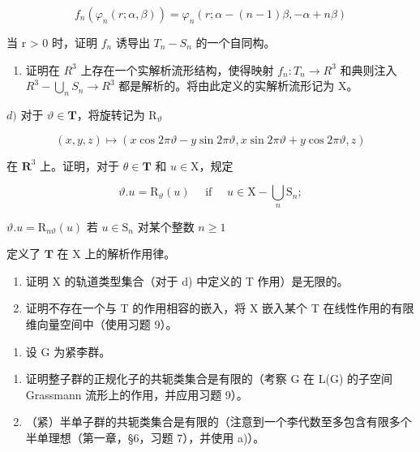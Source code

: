 \[
f _ {n} (\varphi_ {n} (r; \alpha , \beta)) = \varphi_ {n} (r; \alpha - (n - 1) \beta , - \alpha + n \beta)
\]

当 r \textgreater{} 0 时，证明 \(f_{n}\) 诱导出 \(T_{n} - S_{n}\) 的一个自同构。

\begin{enumerate}
\def\labelenumi{\alph{enumi})}
\setcounter{enumi}{2}
\tightlist
\item
  证明在 \(R^{3}\) 上存在一个实解析流形结构，使得映射 \(f_{n}: T_{n} \to R^{3}\) 和典则注入 \(R^{3}-\bigcup_{n} S_{n} \to R^{3}\) 都是解析的。将由此定义的实解析流形记为 X。
\end{enumerate}

\(d)\) 对于 \(\vartheta \in \mathbf{T}\)，将旋转记为 \(\mathrm{R}_{\vartheta}\)

\[
(x, y, z) \mapsto (x \cos 2 \pi \vartheta - y \sin 2 \pi \vartheta , x \sin 2 \pi \vartheta + y \cos 2 \pi \vartheta , z)
\]

在 \(\mathbf{R}^3\) 上。证明，对于 \(\theta \in \mathbf{T}\) 和 \(u \in \mathrm{X}\)，规定

\[
\vartheta . u = \mathrm{R} _ {\vartheta} (u) \quad \text { if } \quad u \in \mathrm{X} - \bigcup_ {n} \mathrm{S} _ {n};
\]

\(\vartheta .u = \mathrm{R}_{n\vartheta}(u)\) 若 \(u\in \mathrm{S}_n\) 对某个整数 \(n\geq 1\)

定义了 \(\mathbf{T}\) 在 \(\mathrm{X}\) 上的解析作用律。

\begin{enumerate}
\def\labelenumi{\alph{enumi})}
\setcounter{enumi}{4}
\item
  证明 X 的轨道类型集合（对于 d) 中定义的 T 作用）是无限的。
\item
  证明不存在一个与 T 的作用相容的嵌入，将 X 嵌入某个 T 在线性作用的有限维向量空间中（使用习题 9）。
\end{enumerate}

\begin{enumerate}
\def\labelenumi{\arabic{enumi})}
\setcounter{enumi}{11}
\tightlist
\item
  设 \(\mathrm{G}\) 为紧李群。
\end{enumerate}

\begin{enumerate}
\def\labelenumi{\alph{enumi})}
\item
  证明整子群的正规化子的共轭类集合是有限的（考察 G 在 L(G) 的子空间 Grassmann 流形上的作用，并应用习题 9）。
\item
  （紧）半单子群的共轭类集合是有限的（注意到一个李代数至多包含有限多个半单理想（第一章，§6，习题 7），并使用 a)）。
\end{enumerate}

